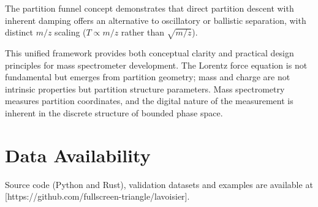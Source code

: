 \documentclass[twocolumn,10pt,a4paper]{article}
\theoremstyle{definition}
\theoremstyle{remark}
\begin{document}
The partition funnel concept demonstrates that direct partition descent with inherent damping offers an alternative to oscillatory or ballistic separation, with distinct $m/z$ scaling ($T \propto m/z$ rather than $\sqrt{m/z}$).

This unified framework provides both conceptual clarity and practical design principles for mass spectrometer development. The Lorentz force equation is not fundamental but emerges from partition geometry; mass and charge are not intrinsic properties but partition structure parameters. Mass spectrometry measures partition coordinates, and the digital nature of the measurement is inherent in the discrete structure of bounded phase space.


\section*{Data Availability}

Source code (Python and Rust), validation datasets and examples are available at [https://github.com/fullscreen-triangle/lavoisier].




\end{document}
